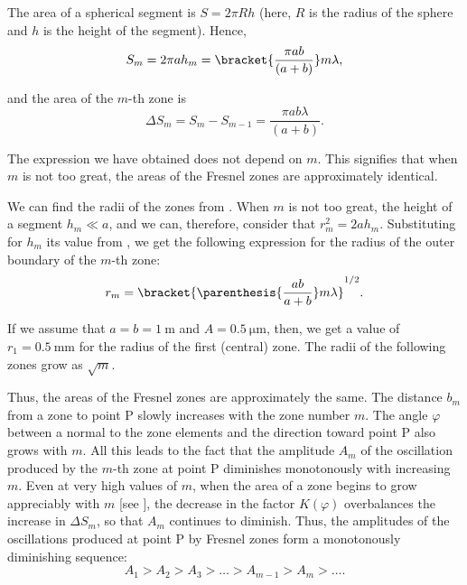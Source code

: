 The area of a spherical segment is $S=2\pi Rh$ (here, $R$ is the radius of the sphere and $h$ is the height of the segment).
Hence,
\begin{equation*}
    S_m = 2\pi a h_m = \bracket{\frac{\pi a b}{(a+b)}} m \lambda,
\end{equation*}

\noindent
and the area of the $m$-th zone is
\begin{equation*}
    \Delta{S_m} = S_m - S_{m-1} = \frac{\pi a b \lambda}{(a+b)}.
\end{equation*}

\noindent
The expression we have obtained does not depend on $m$.
This signifies that when $m$ is not too great, the areas of the Fresnel zones are approximately identical.

We can find the radii of the zones from .
When $m$ is not too great, the height of a segment $h_m\ll a$, and we can, therefore, consider that $r_m^2= 2ah_m$.
Substituting for $h_m$ its value from ,
we get the following expression for the radius of the outer boundary of the $m$-th zone:
\begin{equation}\label{eq:18_8}
    r_m = \bracket{ \parenthesis{ \frac{ab}{a+b} } m \lambda }^{1/2}.
\end{equation}

\noindent
If we assume that $a=b=\SI{1}{\metre}$ and $A=\SI{0.5}{\micro\metre}$, then, we get a value of $r_1=\SI{0.5}{\milli\metre}$ for the radius of the first (central) zone.
The radii of the following zones grow as $\sqrt{m}$.

Thus, the areas of the Fresnel zones are approximately the same.
The distance $b_m$ from a zone to point P slowly increases with the zone number $m$.
The angle $\varphi$ between a normal to the zone elements and the direction toward point P also grows with $m$.
All this leads to the fact that the amplitude $A_m$ of the oscillation produced by the $m$-th zone at point P diminishes monotonously with increasing $m$.
Even at very high values of $m$, when the area of a zone begins to grow appreciably with $m$ [see ], the decrease in the factor $K(\varphi)$ overbalances the increase in $\Delta{S_m}$, so that $A_m$ continues to diminish.
Thus, the amplitudes of the oscillations produced at point P by Fresnel zones form a monotonously diminishing sequence:
\begin{equation*}
    A_1 > A_2 > A_3 > \ldots > A_{m-1} > A_m > \ldots .
\end{equation*}

